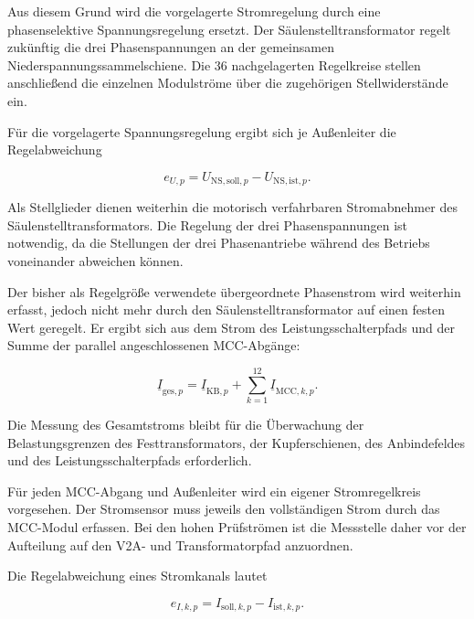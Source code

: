 Aus diesem Grund wird die vorgelagerte Stromregelung durch eine
phasenselektive Spannungsregelung ersetzt. Der
Säulenstelltransformator regelt zukünftig die drei Phasenspannungen
an der gemeinsamen Niederspannungssammelschiene. Die 36
nachgelagerten Regelkreise stellen anschließend die einzelnen
Modulströme über die zugehörigen Stellwiderstände ein.

Für die vorgelagerte Spannungsregelung ergibt sich je Außenleiter die
Regelabweichung

\begin{equation}
    e_{U,p}
    =
    U_{\mathrm{NS,soll},p}
    -
    U_{\mathrm{NS,ist},p}.
    \label{eq:regelabweichung_phasenspannung}
\end{equation}

Als Stellglieder dienen weiterhin die motorisch verfahrbaren
Stromabnehmer des Säulenstelltransformators. Die Regelung der drei
Phasenspannungen ist notwendig, da die Stellungen der drei
Phasenantriebe während des Betriebs voneinander abweichen können.

Der bisher als Regelgröße verwendete übergeordnete Phasenstrom wird
weiterhin erfasst, jedoch nicht mehr durch den
Säulenstelltransformator auf einen festen Wert geregelt. Er ergibt
sich aus dem Strom des Leistungsschalterpfads und der Summe der
parallel angeschlossenen MCC-Abgänge:

\begin{equation}
    \underline{I}_{\mathrm{ges},p}
    =
    \underline{I}_{\mathrm{KB},p}
    +
    \sum_{k=1}^{12}
    \underline{I}_{\mathrm{MCC},k,p}.
    \label{eq:gesamtstrom_neues_regelkonzept}
\end{equation}

Die Messung des Gesamtstroms bleibt für die Überwachung der
Belastungsgrenzen des Festtransformators, der Kupferschienen, des
Anbindefeldes und des Leistungsschalterpfads erforderlich.

Für jeden MCC-Abgang und Außenleiter wird ein eigener Stromregelkreis
vorgesehen. Der Stromsensor muss jeweils den vollständigen Strom durch
das MCC-Modul erfassen. Bei den hohen Prüfströmen ist die Messstelle
daher vor der Aufteilung auf den V2A- und Transformatorpfad
anzuordnen.

Die Regelabweichung eines Stromkanals lautet

\begin{equation}
    e_{I,k,p}
    =
    I_{\mathrm{soll},k,p}
    -
    I_{\mathrm{ist},k,p}.
    \label{eq:regelabweichung_modulstrom}
\end{equation}

